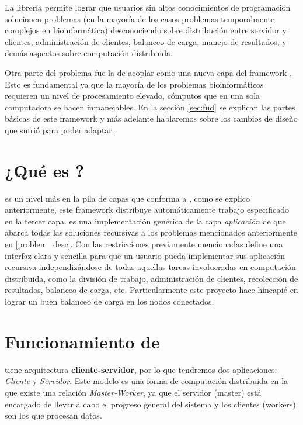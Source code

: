 La librería permite lograr que usuarios sin altos conocimientos de programación solucionen problemas (en la mayoría de los casos
problemas temporalmente complejos en bioinformática) desconociendo sobre distribución entre servidor y clientes, administración de
clientes, balanceo de carga, manejo de resultados, y demás aspectos sobre computación distribuida.

Otra parte del problema fue la de acoplar \rc{} como una nueva capa del framework \fud. Esto es fundamental ya que la mayoría de los
problemas bioinformáticos requieren un nivel de procesamiento elevado, cómputos que en una sola computadora se hacen inmanejables. En la
sección \ref{sec:fud} se explican las partes básicas de este framework y más adelante hablaremos sobre los cambios de diseño que sufrió
para poder adaptar \rc.

\section{¿Qué es \rc?}

\rc{} es un nivel más en la pila de capas que conforma a \fud, como se explico anteriormente, este framework distribuye
automáticamente trabajo especificado en la tercer capa. \rc{} es una implementación genérica de la capa
\textit{aplicación} de \fud{} que abarca todas las soluciones recursivas a los problemas mencionados anteriormente en
\ref{problem_desc}. Con las restricciones previamente mencionadas \rc{} define una interfaz clara y sencilla para que un
usuario pueda implementar sus aplicación recursiva independizándose de todas aquellas tareas involucradas en computación
distribuida, como la división de trabajo, administración de clientes, recolección de resultados, balanceo de carga, etc.
Particularmente este proyecto hace hincapié en lograr un buen balanceo de carga en los nodos conectados.

\section{Funcionamiento de \rc}

\rc{} tiene arquitectura \textbf{cliente-servidor}, por lo que tendremos dos aplicaciones: \textit{Cliente} y \textit{Servidor}.
Este modelo es una forma de computación distribuida en la que existe una relación \textit{Master-Worker}, ya que el servidor (master) está
encargado de llevar a cabo el progreso general del sistema y los clientes (workers) son los que procesan datos.

